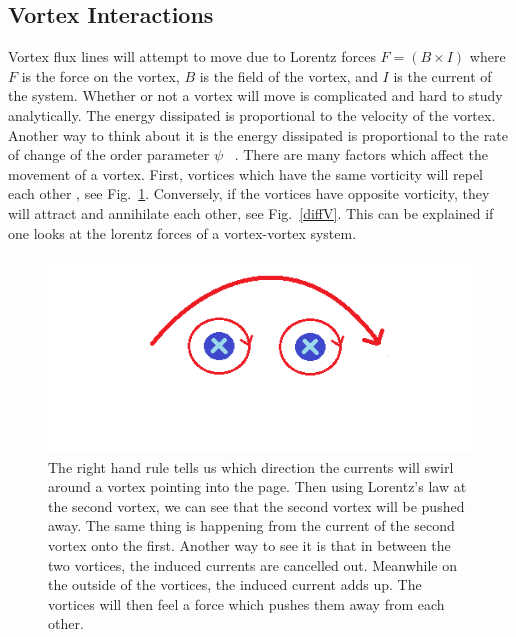 \subsection{Vortex Interactions}
	 Vortex flux lines will attempt to move due to Lorentz forces $F = (B \times I)$ where $F$ is the force on the vortex, $B$ is the field of the vortex, and $I$ is the current of the system. Whether or not a vortex will move is complicated and hard to study analytically. The energy dissipated is proportional to the velocity of the vortex. Another way to think about it is the energy dissipated is proportional to the rate of change of the order parameter $\psi$ ~\cite{Kopnin00}. There are many factors which affect the movement of a vortex. First, vortices which have the same vorticity will repel each other , see Fig.~\ref{sameV}. Conversely, if the vortices have opposite vorticity, they will attract and annihilate each other, see Fig.~\ref{diffV}. This can be explained if one looks at the lorentz forces of a vortex-vortex system.

\begin{figure}[htbp]
\begin{center}
\includegraphics[scale=.50]{sameDirection.png}
\caption{The right hand rule tells us which direction the currents will swirl around a vortex pointing into the page. Then using Lorentz's law  at the second vortex, we can see that the second vortex will be pushed away. The same thing is happening from the current of the second vortex onto the first. Another way to see it is that in between the two vortices, the induced currents are cancelled out. Meanwhile on the outside of the vortices, the induced current adds up. The vortices will then feel a force which pushes them away from each other.}
\label{sameV}
\end{center}
\end{figure}

